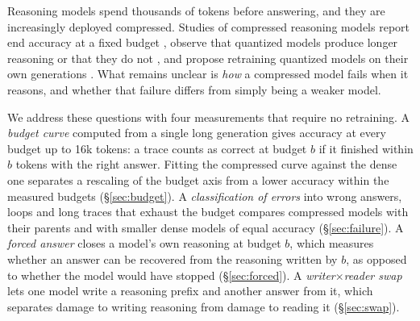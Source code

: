 \documentclass[10pt]{article}
\begin{document}
Reasoning models spend thousands of tokens before answering, and they are increasingly deployed compressed. Studies of compressed reasoning models report end accuracy at a fixed budget \citep{liu2025quantization,zhang2025compression}, observe that quantized models produce longer reasoning \citep{lotfi2026quantized} or that they do not \citep{liu2025quantization}, and propose retraining quantized models on their own generations \citep{chen2026onpolicy,zheng2026rightonq}. What remains unclear is \emph{how} a compressed model fails when it reasons, and whether that failure differs from simply being a weaker model.

We address these questions with four measurements that require no retraining. A \emph{budget curve} computed from a single long generation gives accuracy at every budget up to 16k tokens: a trace counts as correct at budget $b$ if it finished within $b$ tokens with the right answer. Fitting the compressed curve against the dense one separates a rescaling of the budget axis from a lower accuracy within the measured budgets (\S\ref{sec:budget}). A \emph{classification of errors} into wrong answers, loops and long traces that exhaust the budget compares compressed models with their parents and with smaller dense models of equal accuracy (\S\ref{sec:failure}). A \emph{forced answer} closes a model's own reasoning at budget $b$, which measures whether an answer can be recovered from the reasoning written by $b$, as opposed to whether the model would have stopped (\S\ref{sec:forced}). A \emph{writer$\times$reader swap} lets one model write a reasoning prefix and another answer from it, which separates damage to writing reasoning from damage to reading it (\S\ref{sec:swap}).
\end{document}
